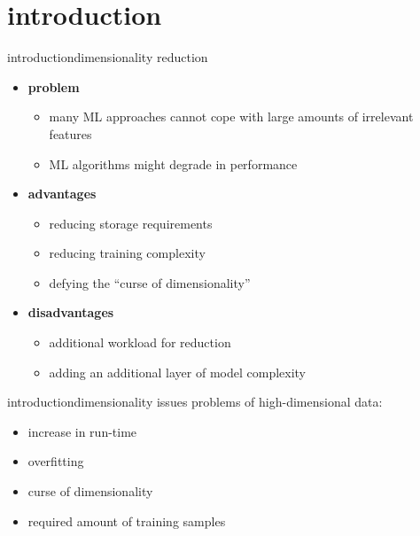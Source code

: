    \section[intro]{introduction}
		\begin{frame}{introduction}{dimensionality reduction}
            \begin{itemize}
                \item   \textbf{problem}
                    \begin{itemize}
                        \item   many ML approaches cannot cope with large amounts of irrelevant features
                        \item   ML algorithms might degrade in performance
                    \end{itemize}
                \bigskip
                \item<2->   \textbf{advantages}
                    \begin{itemize}
                        \item   reducing storage requirements
                        \item   reducing training complexity
                        \item   defying the ``curse of dimensionality''
                    \end{itemize}
                \bigskip
                \item<3->   \textbf{disadvantages}
                    \begin{itemize}
                        \item   additional workload for reduction
                        \item   adding an additional layer of model complexity
                    \end{itemize}
            \end{itemize}
		\end{frame}
        
		\begin{frame}{introduction}{dimensionality issues}
            \vspace{-2mm}
            problems of high-dimensional data:
            \begin{itemize}
                \item   increase in run-time
                \item   overfitting
                \item   curse of dimensionality
                \item   required amount of training samples 
            \end{itemize}
			
		\end{frame}

